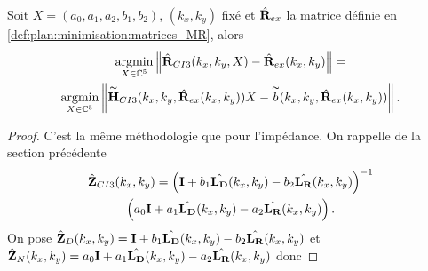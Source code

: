     \begin{prop}
      Soit \(X = (a_0,a_1,a_2,b_1,b_2)\), \((k_x,k_y)\) fixé et \(\hat{\mathbf{R}}_{ex}\) la matrice définie en \ref{def:plan:minimisation:matrices_MR}, alors
      \begin{multline*}
        {\underset{X\in\mathbb C^5}{\operatorname{argmin}}} \left\lVert\hat{\mathbf{R}}_{CI3}(k_x,k_y,X) - \hat{\mathbf{R}}_{ex}(k_x,k_y)\right\rVert =
        \\
        {\underset{X\in\mathbb C^5}{\operatorname{argmin}}} \left\lVert\overset{\thicksim}{\mathbf{H}}_{CI3}(k_x,k_y,\hat{\mathbf{R}}_{ex}(k_x,k_y))X - \overset{\thicksim}{b}(k_x,k_y,\hat{\mathbf{R}}_{ex}(k_x,k_y))\right\rVert.
      \end{multline*}
    \end{prop}

    \begin{proof}
      C'est la même méthodologie que pour l'impédance.
      On rappelle de la section précédente
      \begin{multline*}
        \hat{\mathbf{Z}}_{CI3}(k_x,k_y) = \left(\mathbf{I} + b_1 \hat{\mathbf{L_D}}(k_x,k_y) - b_2 \hat{\mathbf{L_R}}(k_x,k_y) \right)^{-1}
        \\
        \left(a_0 \mathbf{I} + a_1 {\hat{\mathbf{L_D}}(k_x,k_y)} - a_2 {\hat{\mathbf{L_R}}(k_x,k_y)}\right).
      \end{multline*}
      On pose \(\hat{\mathbf{Z}}_D(k_x,k_y) = \mathbf{I} + b_1 \hat{\mathbf{L_D}}(k_x,k_y) - b_2 \hat{\mathbf{L_R}}(k_x,k_y)\) et \(\hat{\mathbf{Z}}_N(k_x,k_y) = a_0 \mathbf{I} + a_1 {\hat{\mathbf{L_D}}(k_x,k_y)} - a_2 {\hat{\mathbf{L_R}}(k_x,k_y)}\) donc


\end{proof}
